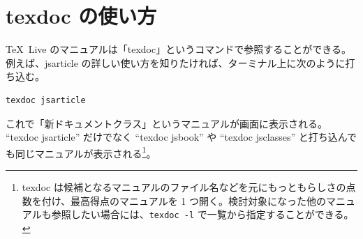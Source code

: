 \section{texdoc の使い方}
\TeX~Live のマニュアルは「texdoc」というコマンドで参照することができる。
例えば、jsarticle の詳しい使い方を知りたければ、ターミナル上に次のように打ち込む。
\begin{mdframed}[roundcorner=0.50zw,leftmargin=3.00zw,rightmargin=3.00zw,skipabove=0.40zw,skipbelow=0.40zw,innertopmargin=4.00pt,innerbottommargin=4.00pt,innerleftmargin=5.00pt,innerrightmargin=5.00pt,linecolor=gray!090,linewidth=0.50pt,backgroundcolor=gray!90]\color{gray!10}
\begin{verbatim}
texdoc jsarticle
\end{verbatim}
\end{mdframed}
これで「\pLaTeXe{}新ドキュメントクラス」というマニュアルが画面に表示される。
``texdoc jsarticle'' だけでなく ``texdoc jsbook'' や ``texdoc jsclasses'' と打ち込んでも同じマニュアルが表示される\footnote{texdoc は候補となるマニュアルのファイル名などを元にもっともらしさの点数を付け、最高得点のマニュアルを 1 つ開く。検討対象になった他のマニュアルも参照したい場合には、\texttt{texdoc -l} で一覧から指定することができる。}。
